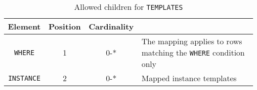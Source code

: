 \begin{table}[!htbp]
  \small
  \centering
  \begin{tabulary}{\linewidth}{|c |c |c|J|}
    \hline 
        \textbf{Element} &
        \textbf{Position} &
        \textbf{Cardinality} &
        \\
    \hline
    \hline  
        \texttt{WHERE}  &        
        1 &           
        0-* &
        The mapping applies to rows matching the \texttt{WHERE} condition only\\
    \hline    
        \texttt{INSTANCE} &           
        2 &           
        0-* &
        Mapped instance templates\\
    \hline 
  \end{tabulary}
  \caption{Allowed children for \texttt{TEMPLATES}} 
  \label{tbl:templates-children}
\end{table}
